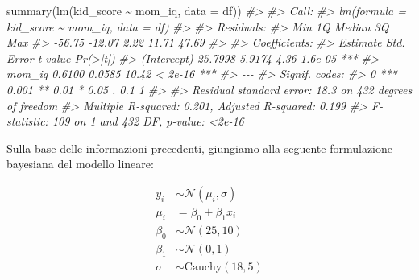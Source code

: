\documentclass[
  11pt,
]{krantz}
\makeatletter
\newenvironment{Shaded}{\begin{snugshade}}{\end{snugshade}}
\newcommand{\AttributeTok}[1]{\textcolor[rgb]{0.61,0.61,0.61}{#1}}
\newcommand{\CommentTok}[1]{\textcolor[rgb]{0.37,0.37,0.37}{\textit{#1}}}
\newcommand{\FunctionTok}[1]{\textcolor[rgb]{0,0,0}{#1}}
\newcommand{\NormalTok}[1]{#1}
\newcommand{\SpecialCharTok}[1]{\textcolor[rgb]{0,0,0}{#1}}
\newenvironment{kframe}{%
\medskip{}
\setlength{\fboxsep}{.8em}
 \def\at@end@of@kframe{}%
 \ifinner\ifhmode%
  \def\at@end@of@kframe{\end{minipage}}%
  \begin{minipage}{\columnwidth}%
 \fi\fi%
 \def\FrameCommand##1{\hskip\@totalleftmargin \hskip-\fboxsep
 \colorbox{shadecolor}{##1}\hskip-\fboxsep
     \hskip-\linewidth \hskip-\@totalleftmargin \hskip\columnwidth}%
 \MakeFramed {\advance\hsize-\width
   \@totalleftmargin\z@ \linewidth\hsize
   \@setminipage}}%
 {\par\unskip\endMakeFramed%
 \at@end@of@kframe}
\renewenvironment{Shaded}{\begin{kframe}}{\end{kframe}}
\theoremstyle{definition}
\theoremstyle{definition}
\theoremstyle{definition}
\theoremstyle{definition}
\theoremstyle{remark}
\makeatother
\begin{document}
\begin{Shaded}
\begin{Highlighting}[]
\FunctionTok{summary}\NormalTok{(}\FunctionTok{lm}\NormalTok{(kid\_score }\SpecialCharTok{\textasciitilde{}}\NormalTok{ mom\_iq, }\AttributeTok{data =}\NormalTok{ df))}
\CommentTok{\#\textgreater{} }
\CommentTok{\#\textgreater{} Call:}
\CommentTok{\#\textgreater{} lm(formula = kid\_score \textasciitilde{} mom\_iq, data = df)}
\CommentTok{\#\textgreater{} }
\CommentTok{\#\textgreater{} Residuals:}
\CommentTok{\#\textgreater{}    Min     1Q Median     3Q    Max }
\CommentTok{\#\textgreater{} {-}56.75 {-}12.07   2.22  11.71  47.69 }
\CommentTok{\#\textgreater{} }
\CommentTok{\#\textgreater{} Coefficients:}
\CommentTok{\#\textgreater{}             Estimate Std. Error t value Pr(\textgreater{}|t|)    }
\CommentTok{\#\textgreater{} (Intercept)  25.7998     5.9174    4.36  1.6e{-}05 ***}
\CommentTok{\#\textgreater{} mom\_iq        0.6100     0.0585   10.42  \textless{} 2e{-}16 ***}
\CommentTok{\#\textgreater{} {-}{-}{-}}
\CommentTok{\#\textgreater{} Signif. codes:  }
\CommentTok{\#\textgreater{} 0 \textquotesingle{}***\textquotesingle{} 0.001 \textquotesingle{}**\textquotesingle{} 0.01 \textquotesingle{}*\textquotesingle{} 0.05 \textquotesingle{}.\textquotesingle{} 0.1 \textquotesingle{} \textquotesingle{} 1}
\CommentTok{\#\textgreater{} }
\CommentTok{\#\textgreater{} Residual standard error: 18.3 on 432 degrees of freedom}
\CommentTok{\#\textgreater{} Multiple R{-}squared:  0.201,  Adjusted R{-}squared:  0.199 }
\CommentTok{\#\textgreater{} F{-}statistic:  109 on 1 and 432 DF,  p{-}value: \textless{}2e{-}16}
\end{Highlighting}
\end{Shaded}

Sulla base delle informazioni precedenti, giungiamo alla seguente formulazione bayesiana del modello lineare:

\[
\begin{aligned}
y_i &\sim \mathcal{N}(\mu_i, \sigma) \\
\mu_i &= \beta_0 + \beta_1 x_i \\
\beta_0 &\sim \mathcal{N}(25, 10) \\
\beta_1 &\sim \mathcal{N}(0, 1) \\
\sigma &\sim \text{Cauchy}(18, 5) 
\end{aligned}
\]
\end{document}
